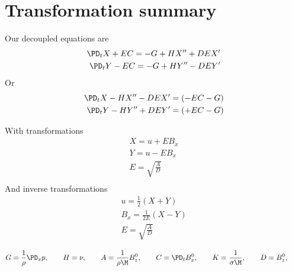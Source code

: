 \documentclass[11pt]{article}
\begin{document}
\section{Transformation summary}
Our decoupled equations are
\begin{equation}\begin{aligned}
\PD_t X + EC = -G+ H X'' + DE X'\\
\PD_t Y - EC = -G+ H Y'' - DE Y'\\
\end{aligned} \end{equation}
Or
\begin{equation}\begin{aligned}
\PD_t X - H X'' - DE X'  = (- EC -G)\\
\PD_t Y - H Y'' + DE Y'  = (+ EC -G)\\
\end{aligned} \end{equation}

With transformations
\begin{equation}\begin{aligned}
X = u + E B_x \\
Y = u - E B_x \\
E = \sqrt{\frac{A}{D}} \\
\end{aligned} \end{equation}
And inverse transformations
\begin{equation}\begin{aligned}
u   = \frac{1}{2} \left( X + Y \right) \\
B_x = \frac{1}{2E} \left( X - Y \right) \\
E = \sqrt{\frac{A}{D}} \\
\end{aligned} \end{equation}
\begin{equation}\begin{aligned}
G = \frac{1}{\rho}\PD_x p, \qquad
H = \nu, \qquad
A = \frac{1}{\rho \M} B_z^0, \qquad
C = \PD_t B_x^0, \qquad
K = \frac{1}{\sigma \M}, \qquad
D = B_z^0, \qquad
\end{aligned} \end{equation}
\end{document}
